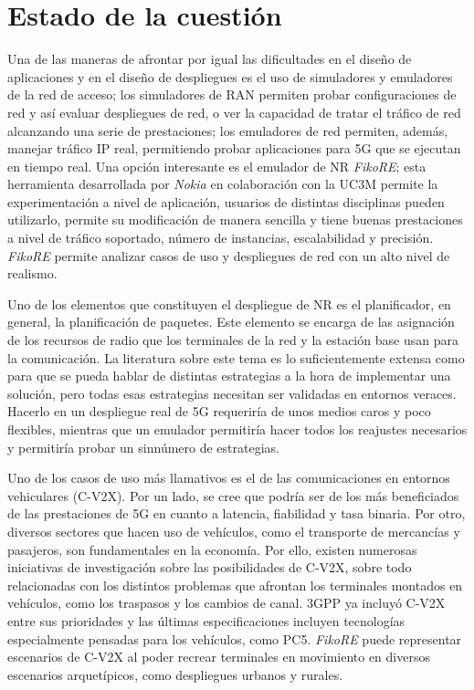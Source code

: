 \documentclass[12pt]{report} %
\begin{document}
\section{Estado de la cuestión}

Una de las maneras de afrontar por igual las dificultades en el diseño de aplicaciones y en el diseño de despliegues es el uso de simuladores y emuladores de la red de acceso;
los simuladores de RAN permiten probar configuraciones de red y así evaluar despliegues de red,
o ver la capacidad de tratar el tráfico de red alcanzando una serie de prestaciones;
los emuladores de red permiten, además, manejar tráfico IP real, permitiendo probar aplicaciones para 5G que se ejecutan en tiempo real.
Una opción interesante es el emulador de NR \textit{FikoRE};
esta herramienta desarrollada por \textit{Nokia} en colaboración con la UC3M
permite la experimentación a nivel de aplicación,
usuarios de distintas disciplinas pueden utilizarlo,
permite su modificación de manera sencilla
y tiene buenas prestaciones a nivel de tráfico soportado, número de instancias, escalabilidad  y precisión.
\textit{FikoRE} permite analizar casos de uso y despliegues de red con un alto nivel de realismo.
\cite{RefWorks:5, RefWorks:3}

Uno de los elementos que constituyen el despliegue de NR es el planificador, en general, la planificación de paquetes.
Este elemento se encarga de las asignación de los recursos de radio que los terminales de la red y la estación base usan para la comunicación.
\cite{RefWorks:26}
La literatura sobre este tema es lo suficientemente extensa como para que se pueda hablar de distintas estrategias a la hora de implementar una solución,
pero todas esas estrategias necesitan ser validadas en entornos veraces.
Hacerlo en un despliegue real de 5G requeriría de unos medios caros y poco flexibles,
mientras que un emulador permitiría hacer todos los reajustes necesarios y permitiría probar un sinnúmero de estrategias.

Uno de los casos de uso más llamativos es el de las comunicaciones en entornos vehiculares (C-V2X).
Por un lado, se cree que podría ser de los más beneficiados de las prestaciones de 5G en cuanto a latencia, fiabilidad y tasa binaria.
Por otro, diversos sectores que hacen uso de vehículos, como el transporte de mercancías y pasajeros, son fundamentales en la economía.
Por ello, existen numerosas iniciativas de investigación sobre las posibilidades de C-V2X,
sobre todo relacionadas con los distintos problemas que afrontan los terminales montados en vehículos, como los traspasos y los cambios de canal.
3GPP ya incluyó C-V2X entre sus prioridades y las últimas especificaciones incluyen tecnologías especialmente pensadas para los vehículos, como PC5.
\cite{RefWorks:25}
\textit{FikoRE} puede representar escenarios de C-V2X al poder recrear terminales en movimiento en diversos escenarios arquetípicos, como despliegues urbanos y rurales.
\end{document}
